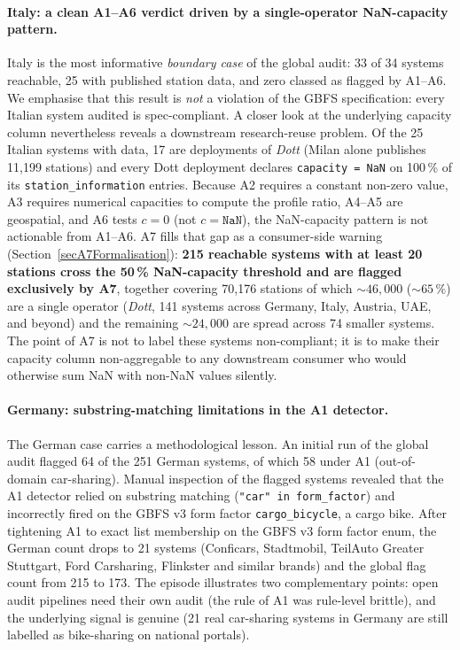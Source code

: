 \documentclass[11pt,a4paper]{article}
\begin{document}
\paragraph{Italy: a clean A1--A6 verdict driven by a single-operator NaN-capacity pattern.}
Italy is the most informative \emph{boundary case} of the global
audit: 33 of 34 systems reachable, 25 with published station data,
and zero classed as flagged by A1--A6. We emphasise that this
result is \emph{not} a violation of the GBFS specification: every
Italian system audited is spec-compliant. A closer look at the
underlying capacity column nevertheless reveals a downstream
research-reuse problem. Of the 25 Italian systems with data, 17 are
deployments of \emph{Dott} (Milan alone publishes 11{,}199
stations) and every Dott deployment declares \texttt{capacity =
NaN} on 100\,\% of its \texttt{station\_information} entries.
Because A2 requires a constant non-zero value, A3 requires
numerical capacities to compute the profile ratio, A4--A5 are
geospatial, and A6 tests $c = 0$ (not $c = \texttt{NaN}$), the
NaN-capacity pattern is not actionable from A1--A6. A7 fills that
gap as a consumer-side warning (Section~\ref{secA7Formalisation}):
\textbf{215 reachable systems with at least 20 stations cross the
50\,\% NaN-capacity threshold and are flagged exclusively by A7},
together covering 70{,}176 stations of which $\sim 46{,}000$
($\sim 65\,\%$) are a single operator (\emph{Dott}, 141 systems
across Germany, Italy, Austria, UAE, and beyond) and the remaining
$\sim 24{,}000$ are spread across 74 smaller systems. The point of
A7 is not to label these systems non-compliant; it is to make
their capacity column non-aggregable to any downstream consumer
who would otherwise sum NaN with non-NaN values silently.

\paragraph{Germany: substring-matching limitations in the A1 detector.}
The German case carries a methodological lesson. An initial run of
the global audit flagged 64 of the 251 German systems, of which 58
under A1 (out-of-domain car-sharing). Manual inspection of the
flagged systems revealed that the A1 detector relied on substring
matching (\texttt{"car" in form\_factor}) and incorrectly fired on
the GBFS v3 form factor \texttt{cargo\_bicycle}, a cargo bike. After
tightening A1 to exact list membership on the GBFS v3 form factor
enum, the German count drops to 21 systems (Conficars, Stadtmobil,
TeilAuto Greater Stuttgart, Ford Carsharing, Flinkster and similar
brands) and the global flag count from 215 to 173. The episode
illustrates two complementary points: open audit pipelines need
their own audit (the rule of A1 was rule-level brittle), and the
underlying signal is genuine (21 real car-sharing systems in
Germany are still labelled as bike-sharing on national portals).
\end{document}
